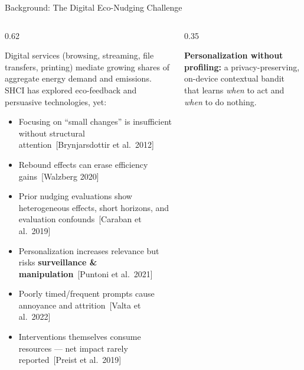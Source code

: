 \documentclass[10pt,aspectratio=169]{beamer}
\newcommand{\emphmark}[1]{\textcolor{chiAccent}{\textbf{#1}}}
\begin{document}
\begin{frame}{Background: The Digital Eco-Nudging Challenge}
\begin{columns}[T]
\begin{column}{0.62\textwidth}
\begin{keybox}
\scriptsize
Digital services (browsing, streaming, file transfers, printing) mediate growing shares of aggregate energy demand and emissions. SHCI has explored eco-feedback and persuasive technologies, yet:
\begin{itemize}
  \item Focusing on ``small changes'' is insufficient without structural attention~[Brynjarsdottir et al.\ 2012]
  \item Rebound effects can erase efficiency gains~[Walzberg 2020]
  \item Prior nudging evaluations show heterogeneous effects, short horizons, and evaluation confounds~[Caraban et al.\ 2019]
\end{itemize}
\end{keybox}
\begin{alertbox}
\scriptsize
\begin{itemize}
  \item Personalization increases relevance but risks \emphmark{surveillance \& manipulation}~[Puntoni et al.\ 2021]
  \item Poorly timed/frequent prompts cause annoyance and attrition~[Valta et al.\ 2022]
  \item Interventions themselves consume resources --- net impact rarely reported~[Preist et al.\ 2019]
\end{itemize}
\end{alertbox}
\end{column}
\begin{column}{0.35\textwidth}
\begin{keybox}
\scriptsize
\textbf{Personalization without profiling:} a privacy-preserving, on-device contextual bandit that learns \emph{when} to act and \emph{when} to do nothing.
\end{keybox}
\vspace{2pt}
\end{column}
\end{columns}
\end{frame}
\end{document}
